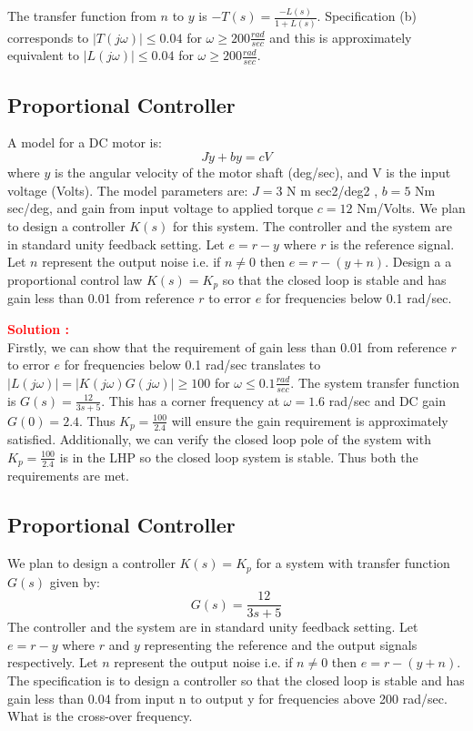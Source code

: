 \documentclass[12pt]{article}
\begin{document}
The transfer function from $n$ to $y$ is $-T(s) =\frac{-L(s)}{1+L(s)}$. Specification (b) corresponds to $|T(j\omega)| \leq 0.04$ for $\omega \geq 200 \frac{rad}{sec}$ and this is approximately equivalent to $|L(j\omega)| \leq 0.04$ for $\omega \geq 200 \frac{rad}{sec}$.
\clearpage

\subsection{Proportional Controller}

A model for a DC motor is:
$$J \dot{y} + by = c V $$
where $y$ is the angular velocity of the motor shaft (deg/sec), and V is the input voltage (Volts).
The model parameters are: $J=3$ N m sec2/deg2 , $b=5$ Nm sec/deg, and gain from input voltage to applied torque $c=12$ Nm/Volts. We plan to design a controller $K(s)$ for this system. The controller and the system are in standard unity feedback setting. Let $e=r-y$ where $r$ is the reference signal. Let $n$ represent the output noise i.e. if $n \neq 0$ then $e=r-(y+n)$. Design a a proportional control law $K(s) = K_p$ so that the closed loop is stable and has gain less than 0.01 from reference $r$ to error $e$ for frequencies below 0.1 rad/sec.
    
\textbf{\textcolor{red}{Solution :}} \\
Firstly, we can show that the requirement of gain less than 0.01 from reference $r$ to error $e$ for frequencies below 0.1 rad/sec translates to $|L(j \omega)|=|K(j \omega) G(j \omega)| \geq 100$ for $\omega \leq 0.1 \frac{rad}{sec}$. The system transfer function is $G(s) =\frac{12}{3s + 5}$. This has a corner frequency at  $\omega=1.6$ rad/sec and DC gain $G(0) = 2.4$. Thus $K_p =\frac{100}{2.4}$ will ensure the gain requirement is approximately satisfied. Additionally, we can verify the closed loop pole of the system with $K_p =\frac{100}{2.4}$ is in the LHP so the closed loop system is stable. Thus both the requirements are met.  
\clearpage

\subsection{Proportional Controller}

We plan to design a controller $K(s) = K_p$ for a system with transfer function $G(s)$ given by:
\[
G(s) = \frac{12}{3s + 5}
\]
The controller and the system are in standard unity feedback setting. Let $e=r-y$ where $r$ and $y$ representing the reference and the output signals respectively. Let $n$ represent the output noise i.e. if $n \neq 0$ then $e=r- (y+n)$. The specification is to design a controller so that the closed loop is stable and has gain less than 0.04 from input n to output y for frequencies above 200 rad/sec. What is the cross-over frequency. 
 
\end{document}
